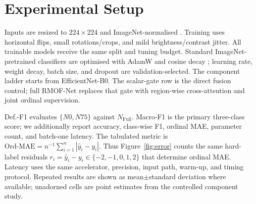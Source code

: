\documentclass[10pt,letterpaper,twocolumn]{article}
\newcommand{\Nfull}{$N_{\mathrm{Full}}$}
\newcommand{\method}{RMOF-Net}
\begin{document}
\section{Experimental Setup}

Inputs are resized to $224\!\times\!224$ and ImageNet-normalised \cite{imagenet2009}. Training uses horizontal flips, small rotations/crops, and mild brightness/contrast jitter. All trainable models receive the same split and tuning budget. Standard ImageNet-pretrained classifiers are optimised with AdamW and cosine decay \cite{adamw2019}; learning rate, weight decay, batch size, and dropout are validation-selected. The component ladder starts from EfficientNet-B0. The scalar-gate row is the direct fusion control; full \method{} replaces that gate with region-wise cross-attention and joint ordinal supervision.

Def.-F1 evaluates $\{N0,N75\}$ against \Nfull. Macro-F1 is the primary three-class score; we additionally report accuracy, class-wise F1, ordinal MAE, parameter count, and batch-one latency. The tabulated metric is $\mathrm{Ord\mbox{-}MAE}=n^{-1}\sum_{i=1}^{n}|\hat y_i-y_i|$. Thus Figure~\ref{fig:error} counts the same hard-label residuals $r_i=\hat y_i-y_i\in\{-2,-1,0,1,2\}$ that determine ordinal MAE. Latency uses the same accelerator, precision, input path, warm-up, and timing protocol. Repeated results are shown as mean$\pm$standard deviation where available; unadorned cells are point estimates from the controlled component study.
\end{document}
